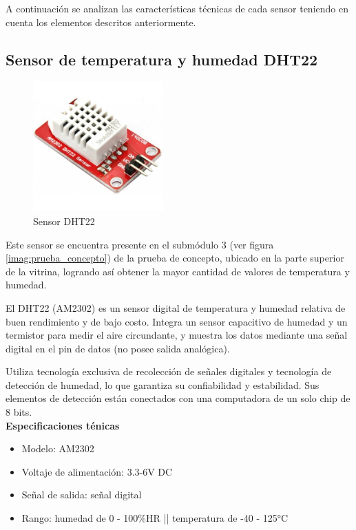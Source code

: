A continuación se analizan las características técnicas de cada sensor teniendo en cuenta los elementos descritos anteriormente.

\subsection{Sensor de temperatura y humedad DHT22}\label{sub:dht22}

    \begin{figure}[H]
      \centering
      \includegraphics[width=5cm, height=5cm]{imagenes/dht22.jpg}
      \caption{Sensor DHT22}
      \label{imag:dht22}
    \end{figure}

Este sensor se encuentra presente en el submódulo 3 (ver figura \ref{imag:prueba_concepto}) de la prueba de concepto, ubicado en la parte superior de la vitrina,
logrando así obtener la mayor cantidad de valores de temperatura y humedad.
   
El DHT22 (AM2302) es un sensor digital de temperatura y humedad relativa de buen rendimiento y de bajo costo. Integra un sensor capacitivo de humedad y un termistor para medir el aire circundante, y muestra los datos mediante una señal digital en el pin de datos (no posee salida analógica).

Utiliza tecnología exclusiva de recolección de señales digitales y tecnología de detección de humedad, lo que garantiza su confiabilidad y estabilidad. Sus elementos de detección están conectados con una computadora de un solo chip de 8 bits.\\

\textbf{Especificaciones ténicas}

\begin{itemize}
    \item Modelo: AM2302
    \item Voltaje de alimentación: 3.3-6V DC
    \item Señal de salida: señal digital
    \item Rango: humedad de 0 - 100\%HR || temperatura de -40 - 125°C
\end{itemize}

